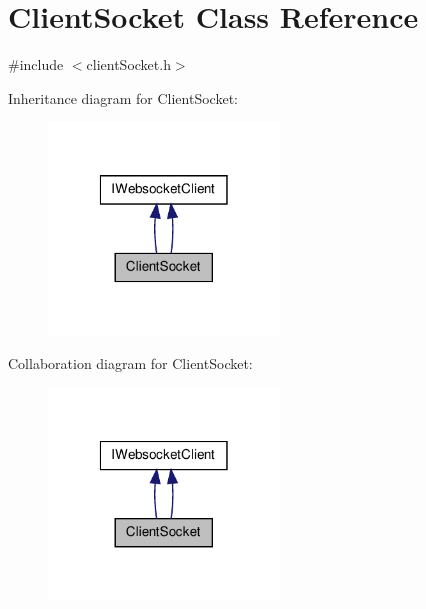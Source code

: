 \hypertarget{class_client_socket}{\section{Client\-Socket Class Reference}
\label{class_client_socket}
}


{\ttfamily \#include $<$client\-Socket.\-h$>$}



Inheritance diagram for Client\-Socket\-:
\nopagebreak
\begin{figure}[H]
\begin{center}
\leavevmode
\includegraphics[width=174pt]{class_client_socket__inherit__graph}
\end{center}
\end{figure}


Collaboration diagram for Client\-Socket\-:
\nopagebreak
\begin{figure}[H]
\begin{center}
\leavevmode
\includegraphics[width=174pt]{class_client_socket__coll__graph}
\end{center}
\end{figure}
